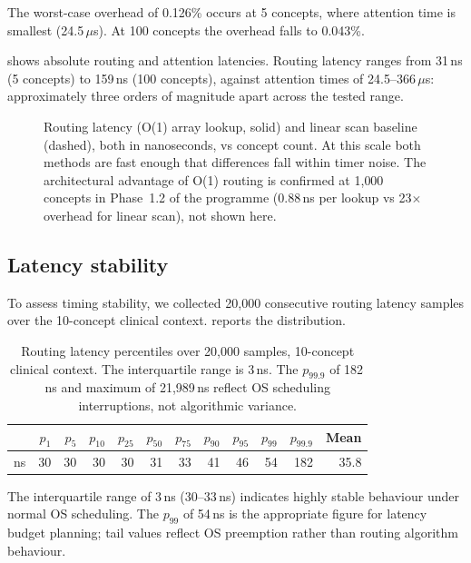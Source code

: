 \documentclass[11pt,a4paper]{article}
\theoremstyle{definition}
\begin{document}
The worst-case overhead of 0.126\% occurs at 5 concepts, where attention time
is smallest (24.5\,$\mu$s). At 100 concepts the overhead falls to 0.043\%.

 shows absolute routing and attention latencies. Routing
latency ranges from 31\,ns (5 concepts) to 159\,ns (100 concepts), against
attention times of 24.5--366\,$\mu$s: approximately three orders of magnitude
apart across the tested range.

\begin{figure}[h]
\centering

\caption{Routing latency (O(1) array lookup, solid) and linear scan baseline
(dashed), both in nanoseconds, vs concept count. At this scale both methods
are fast enough that differences fall within timer noise. The architectural
advantage of O(1) routing is confirmed at 1{,}000 concepts in Phase~1.2
of the programme (0.88\,ns per lookup vs 23$\times$ overhead for linear
scan), not shown here.}
\label{fig:latency}
\end{figure}

\subsection{Latency stability}
\label{sec:stability}

To assess timing stability, we collected 20{,}000 consecutive routing latency
samples over the 10-concept clinical context.
 reports the distribution.

\begin{table}[h]
\centering
\small
\begin{tabular}{@{}lrrrrrrrrrrr@{}}
\toprule
 & $p_1$ & $p_5$ & $p_{10}$ & $p_{25}$ & $p_{50}$ & $p_{75}$
 & $p_{90}$ & $p_{95}$ & $p_{99}$ & $p_{99.9}$ & Mean \\
\midrule
ns & 30 & 30 & 30 & 30 & 31 & 33 & 41 & 46 & 54 & 182 & 35.8 \\
\bottomrule
\end{tabular}
\caption{Routing latency percentiles over 20{,}000 samples, 10-concept
clinical context. The interquartile range is 3\,ns. The $p_{99.9}$ of 182\,ns
and maximum of 21{,}989\,ns reflect OS scheduling interruptions, not
algorithmic variance.}
\label{tab:percentiles}
\end{table}

The interquartile range of 3\,ns (30--33\,ns) indicates highly stable
behaviour under normal OS scheduling. The $p_{99}$ of 54\,ns is the
appropriate figure for latency budget planning; tail values reflect OS
preemption rather than routing algorithm behaviour.
\end{document}
